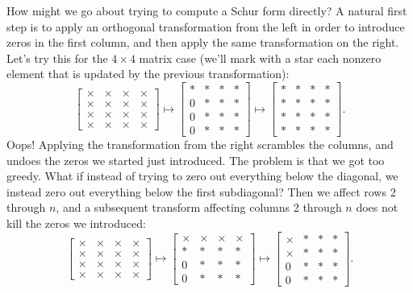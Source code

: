 \documentclass[12pt, leqno]{article} %
\begin{document}
How might we go about trying to compute a Schur form directly?  A
natural first step is to apply an orthogonal transformation from the
left in order to introduce zeros in the first column, and then apply
the same transformation on the right.  Let's try this for the $4
\times 4$ matrix case (we'll mark with a star each nonzero element
that is updated by the previous transformation):
\[
\begin{bmatrix}
  \times & \times & \times & \times \\
  \times & \times & \times & \times \\
  \times & \times & \times & \times \\
  \times & \times & \times & \times
\end{bmatrix} \mapsto
\begin{bmatrix}
  * & * & * & * \\
  0 & * & * & * \\
  0 & * & * & * \\
  0 & * & * & *
\end{bmatrix} \mapsto
\begin{bmatrix}
  * & * & * & * \\
  * & * & * & * \\
  * & * & * & * \\
  * & * & * & *
\end{bmatrix}.
\]
Oops!  Applying the transformation from the right scrambles the
columns, and undoes the zeros we started just introduced.  The
problem is that we got too greedy.  What if instead of trying to
zero out everything below the diagonal, we instead zero out everything
below the first subdiagonal?  Then we affect rows 2 through $n$,
and a subsequent transform affecting columns 2 through $n$ does not
kill the zeros we introduced:
\[
\begin{bmatrix}
  \times & \times & \times & \times \\
  \times & \times & \times & \times \\
  \times & \times & \times & \times \\
  \times & \times & \times & \times
\end{bmatrix} \mapsto
\begin{bmatrix}
  \times & \times & \times & \times \\
  * & * & * & * \\
  0 & * & * & * \\
  0 & * & * & *
\end{bmatrix} \mapsto
\begin{bmatrix}
  \times & * & * & * \\
  \times & * & * & * \\
  0 & * & * & * \\
  0 & * & * & *
\end{bmatrix}.
\]
\end{document}
